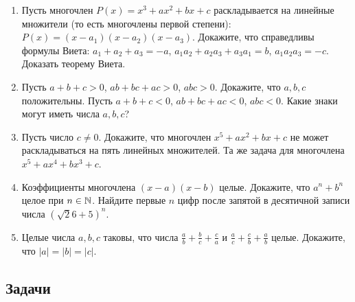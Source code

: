 \begin{enumerate}
\item \ipunkt Пусть многочлен $P(x) = x^3 + ax^2 + bx + c$ раскладывается
 на линейные множители (то есть многочлены первой степени):
$P(x) = (x - a_1)(x - a_2)(x - a_3)$. Докажите, что справедливы формулы Виета:
$a_1+a_2+a_3 = -a$, $a_1a_2 +a_2a_3 +a_3a_1 = b$, $a_1a_2a_3 = -c$.
\ipunkt Доказать теорему Виета.

\item \ipunkt Пусть $a + b + c > 0$, $ab + bc + ac > 0$, $abc > 0$. Докажите,
что $a, b, c$ положительны. \ipunkt Пусть $a + b + c < 0$, $ab + bc + ac < 0$,
$abc < 0$. Какие знаки могут иметь числа $a, b, c$?

\item  \ipunkt Пусть число $c \ne 0$. Докажите, что многочлен $x^5 +ax^2 +bx +c$
не может раскладываться на пять линейных множителей. \ipunkt Та же
задача для многочлена $x^5 + ax^4 + bx^3 + c$.

\item \ipunkt Коэффициенты многочлена $(x-a)(x-b)$ целые. Докажите,
что $a^n + b^n$ целое при $n \in \mathbb N$. \ipunkt Найдите
 первые $n$ цифр после запятой в десятичной записи числа $(\sqrt 26 + 5)^n$.

\item Целые числа $a, b, c$ таковы, что числа $\frac ab + \frac bc + \frac ca$ и $\frac ac + \frac cb + \frac ab$ целые.  Докажите, что $|a| = |b| = |c|$.




\end{enumerate}

\subsection*{Задачи}

